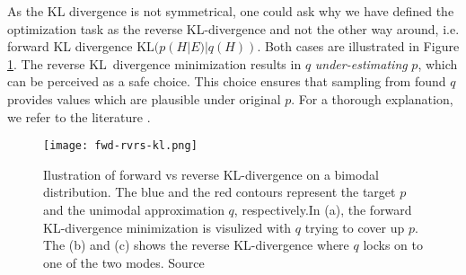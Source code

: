 As the KL divergence is not symmetrical, one could ask why we have defined the optimization task as the reverse KL-divergence and not the other way
around, i.e. forward KL divergence $\mathrm{KL}(p(H | E) | q(H))$. Both cases are illustrated in Figure \ref{fig:forward-reverse}. The reverse 
KL~divergence minimization results in $q$ \textit{under-estimating} $p$, which can be perceived as a safe choice. This choice ensures that sampling
from found $q$ provides values which are plausible under original $p$. For a thorough explanation, we refer to the literature 
\cite{another-vb-intro-2021}.

\begin{figure}[t]
    \centering
    \texttt{[image: fwd-rvrs-kl.png]}
    \caption{Ilustration of forward vs reverse KL-divergence on a bimodal distribution. The blue and the red contours represent the target $p$ 
    and the unimodal approximation $q$, respectively.In (a), the forward KL-divergence minimization is visulized with $q$ trying to cover up $p$.
    The (b) and (c) shows the reverse KL-divergence where $q$ locks on to one of the two modes. Source \cite{another-vb-intro-2021}}
    \label{fig:forward-reverse}
\end{figure}

